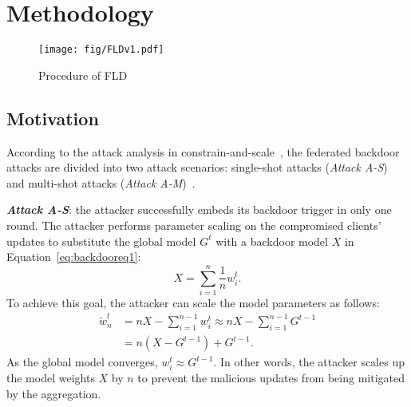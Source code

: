 \section{Methodology}


\begin{figure*}[!t]
\centering
\texttt{[image: fig/FLDv1.pdf]}
\caption{Procedure of FLD}
\label{Overview}
\end{figure*}



\subsection{Motivation}
According to the attack analysis in constrain-and-scale~\cite{howtobackdoor}, the federated backdoor attacks are divided into two attack scenarios: single-shot attacks (\textit{Attack A-S}) and multi-shot attacks (\textit{Attack A-M})~\cite{xie2020dba,am1}.

\noindent\textbf{\textit{Attack A-S}}: the attacker successfully embeds its backdoor trigger in only one round. The attacker performs parameter scaling on the compromised clients' updates to substitute the global model $G^{t}$ with a backdoor model $X$ in Equation~\ref{eq:backdooreq1}: 
\begin{equation}
\label{eq:backdooreq1}
X = {\sum_{i=1}^{n}} \frac{1}{n} w_{i}^{t}.
\end{equation}
To achieve this goal, the attacker can scale the model parameters as follows:
\begin{equation}
\begin{split}\label{eq:backdooreq2}
\tilde{w} _{n}^{t} 
& = nX-\sum_{i=1}^{n-1} w_{i}^{t}\approx nX-\sum_{i=1}^{n-1} G ^{t-1}\\
& = n\left ( X-G ^{t-1} \right )+G ^{t-1}.
\end{split}
\end{equation}
As the global model converges, $w_{i}^{t}\approx  G ^{t-1}$. In other words, the attacker scales up the model weights $X$ by $n$ to prevent the malicious updates from being mitigated by the aggregation.


